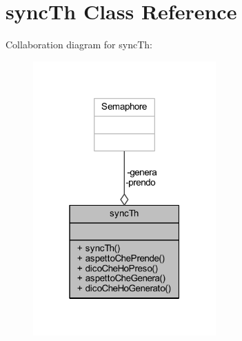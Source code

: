 \hypertarget{class_snake_1_1game_1_1utility_1_1sync_th}{}\section{sync\+Th Class Reference}
\label{class_snake_1_1game_1_1utility_1_1sync_th}


Collaboration diagram for sync\+Th\+:
\nopagebreak
\begin{figure}[H]
\begin{center}
\leavevmode
\includegraphics[width=199pt]{class_snake_1_1game_1_1utility_1_1sync_th__coll__graph}
\end{center}
\end{figure}
